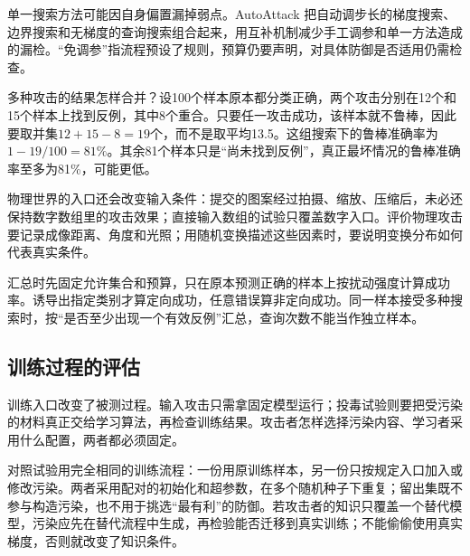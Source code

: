 单一搜索方法可能因自身偏置漏掉弱点。AutoAttack 把自动调步长的梯度搜索、边界搜索和无梯度的查询搜索组合起来，用互补机制减少手工调参和单一方法造成的漏检。“免调参”指流程预设了规则，预算仍要声明，对具体防御是否适用仍需检查。

多种攻击的结果怎样合并？设100个样本原本都分类正确，两个攻击分别在12个和15个样本上找到反例，其中8个重合。只要任一攻击成功，该样本就不鲁棒，因此要取并集$12+15-8=19$个，而不是取平均13.5。这组搜索下的鲁棒准确率为$1-19/100=81\%$。其余81个样本只是“尚未找到反例”，真正最坏情况的鲁棒准确率至多为81\%，可能更低。

物理世界的入口还会改变输入条件：提交的图案经过拍摄、缩放、压缩后，未必还保持数字数组里的攻击效果；直接输入数组的试验只覆盖数字入口。评价物理攻击要记录成像距离、角度和光照；用随机变换描述这些因素时，要说明变换分布如何代表真实条件。

汇总时先固定允许集合和预算，只在原本预测正确的样本上按扰动强度计算成功率。诱导出指定类别才算定向成功，任意错误算非定向成功。同一样本接受多种搜索时，按“是否至少出现一个有效反例”汇总，查询次数不能当作独立样本。

\subsection{训练过程的评估}
\label{sec:security-training-test}

训练入口改变了被测过程。输入攻击只需拿固定模型运行；投毒试验则要把受污染的材料真正交给学习算法，再检查训练结果。攻击者怎样选择污染内容、学习者采用什么配置，两者都必须固定。

对照试验用完全相同的训练流程：一份用原训练样本，另一份只按规定入口加入或修改污染。两者采用配对的初始化和超参数，在多个随机种子下重复；留出集既不参与构造污染，也不用于挑选“最有利”的防御。若攻击者的知识只覆盖一个替代模型，污染应先在替代流程中生成，再检验能否迁移到真实训练；不能偷偷使用真实梯度，否则就改变了知识条件。

